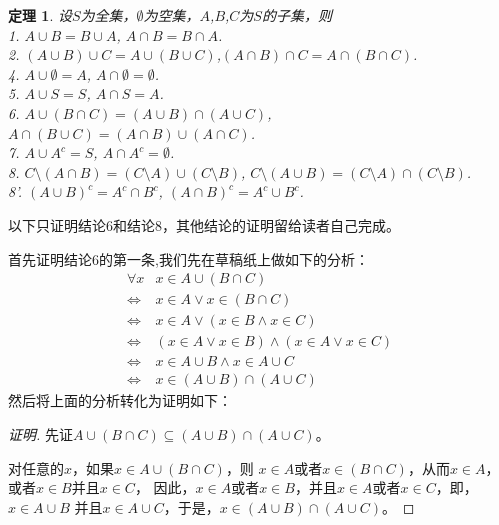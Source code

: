 \documentclass{book}[oneside]
\newtheorem{Thm}{定理}[chapter]
\begin{document}
\begin{CJK*}{UTF8}{gbsn}
\begin{Thm}
设$S$为全集，$\emptyset$为空集，$A$,$B$,$C$为$S$的子集，则\\
1. $A \cup B = B \cup A$, $A \cap B = B \cap A$.\\
2. $(A \cup B) \cup C = A \cup (B \cup C)$,$(A \cap B) \cap C = A \cap (B \cap C)$.\\
4. $A \cup \emptyset = A$, $A \cap \emptyset = \emptyset$.\\
5. $A \cup S = S$, $A \cap S = A$.\\
6. $A \cup (B \cap C) = (A \cup B) \cap (A \cup C)$, $A \cap (B \cup C) = (A \cap B) \cup (A \cap C)$.\\
7. $A \cup A^c = S$, $A \cap A^c = \emptyset$.\\
8. $C \setminus (A \cap B) = (C \setminus A) \cup (C \setminus B)$, $C\setminus (A \cup B) = (C \setminus A) \cap (C \setminus B)$.\\ 
8'. $(A \cup B)^c = A^c \cap B^c$, $(A \cap B)^c = A^c \cup B^c$.\\
\end{Thm}
  以下只证明结论6和结论8，其他结论的证明留给读者自己完成。

  首先证明结论6的第一条,我们先在草稿纸上做如下的分析：
  \begin{equation*}
    \begin{split}
      \forall x &x \in A \cup (B \cap C) \\
      \Leftrightarrow& x \in A \lor x \in (B \cap C)\\
      \Leftrightarrow& x \in A \lor (x \in B \land x \in C)\\
      \Leftrightarrow& (x \in A \lor x \in B) \land (x \in A \lor x \in C)\\
      \Leftrightarrow& x \in A \cup B \land x \in A \cup C\\
      \Leftrightarrow& x \in (A \cup B) \cap (A \cup C)
    \end{split}
  \end{equation*}
  然后将上面的分析转化为证明如下：  
\begin{proof}[证明]
  先证$A \cup (B \cap C) \subseteq (A \cup B) \cap (A \cup C)$。

  对任意的$x$，如果$x \in A \cup (B \cap C)$，则 $x \in A$或者$x \in (B \cap C)$，从而$x \in A$，或者$x \in B$并且$ x \in C$，
  因此，$x \in A$或者$x \in B$，并且$x \in A$或者$ x \in C$，即，$x \in A \cup B$ 并且$x \in A \cup C$，于是，$x \in (A \cup B) \cap (A \cup C)$。


\end{proof}
\end{CJK*}
\end{document}
